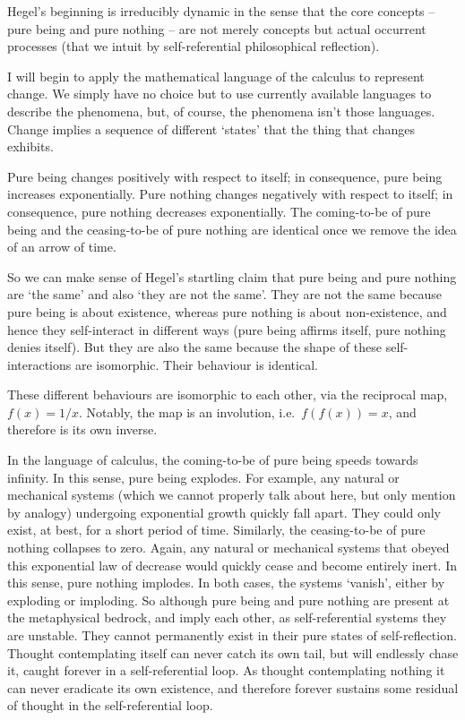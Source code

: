\documentclass[
]{book}
\begin{document}
Hegel's beginning is irreducibly dynamic in the sense that the core concepts -- pure being and pure nothing -- are not merely concepts but actual occurrent processes (that we intuit by self-referential philosophical reflection).

I will begin to apply the mathematical language of the calculus to represent change.
We simply have no choice but to use currently available languages to describe the phenomena, but, of course, the phenomena isn't those languages.
Change implies a sequence of different `states' that the thing that changes exhibits.

Pure being changes positively with respect to itself; in consequence, pure being increases exponentially.
Pure nothing changes negatively with respect to itself; in consequence, pure nothing decreases exponentially.
The coming-to-be of pure being and the ceasing-to-be of pure nothing are identical once we remove the idea of an arrow of time.

So we can make sense of Hegel's startling claim that pure being and pure nothing are `the same' and also `they are not the same'. They are not the same because pure being is about existence, whereas pure nothing is about non-existence, and hence they self-interact in different ways (pure being affirms itself, pure nothing denies itself). But they are also the same because the shape of these self-interactions are isomorphic. Their behaviour is identical.

These different behaviours are isomorphic to each other, via the reciprocal map,
\(f(x)=1/x\). Notably, the map is an involution, i.e.~\(f(f(x))=x\),
and therefore is its own inverse.

In the language of calculus, the coming-to-be of pure being speeds towards infinity. In this sense, pure being explodes. For example, any natural or mechanical systems (which we cannot properly talk about here, but only mention by analogy) undergoing exponential growth quickly fall apart. They could only exist, at best, for a short period of time. Similarly, the ceasing-to-be of pure nothing collapses to zero. Again, any natural or mechanical systems that obeyed this exponential law of decrease would quickly cease and become entirely inert. In this sense, pure nothing implodes. In both cases, the systems `vanish', either by exploding or imploding. So although pure being and pure nothing are present at the metaphysical bedrock, and imply each other, as self-referential systems they are unstable. They cannot permanently exist in their pure states of self-reflection.
Thought contemplating itself can never catch its own tail, but will endlessly chase it, caught forever in a self-referential loop.
As thought contemplating nothing it can never eradicate its own existence, and therefore forever sustains some residual of thought in the self-referential loop.
\end{document}
